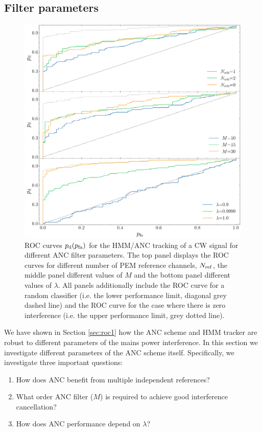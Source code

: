 \documentclass[pra,superscriptaddress,reprint,amsmath,amssymb,nofootinbib]{revtex4-2}
\begin{document}
\subsection{Filter parameters} \label{sec:roc2}
\begin{figure}
	\begin{center}
		\includegraphics[width=\columnwidth]{images/roc_curve_filter_params}
	\end{center}
	\caption{ROC curves $p_{\rm d} (p_{\rm fa})$ for the HMM/ANC tracking of a CW signal for different ANC filter parameters. The top panel displays the ROC curves for different number of PEM reference channels, $N_{\rm ref}$, the middle panel different values of $M$ and the bottom panel different values of $\lambda$. All panels additionally include the ROC curve for a random classifier (i.e. the lower performance limit, diagonal grey dashed line) and the ROC curve for the case where there is zero interference (i.e. the upper performance limit, grey dotted line).}
	\label{fig:roc2}
\end{figure}
We have shown in Section \ref{sec:roc1} how the ANC scheme and HMM tracker are robust to different parameters of the mains power interference. In this section we investigate different parameters of the ANC scheme itself. Specifically, we investigate three important questions:
\begin{enumerate}
	\item How does ANC benefit from multiple independent references?
	\item What order ANC filter ($M$) is required to achieve good interference cancellation? 
	\item How does ANC performance depend on $\lambda$?
\end{enumerate} 
\end{document}
